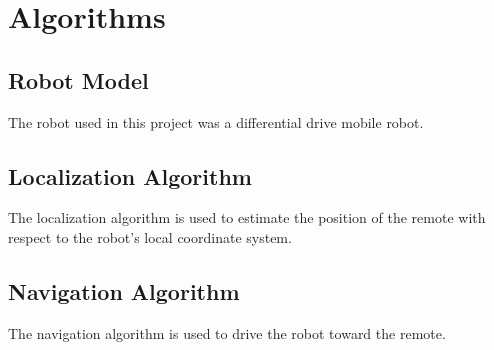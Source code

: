 \chapter{Algorithms}
\label{ch: Chapter4}

\section{Robot Model}
The robot used in this project was a differential drive mobile robot. 


\section{Localization Algorithm}
The localization algorithm is used to estimate the position of the remote with respect to the robot's local coordinate system.

\section{Navigation Algorithm}
The navigation algorithm is used to drive the robot toward the remote.

